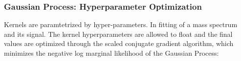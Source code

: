%
%
%            
%
%
%
%
    \subsubsection{Gaussian Process: Hyperparameter Optimization}
    \label{sec:hyperparam}
    Kernels are paramtetrized by hyper-parameters. In fitting of a mass spectrum and its signal. The kernel hyperparameters are allowed to float and the final values are optimized through the scaled conjugate gradient algorithm, which minimizes the negative log marginal likelihood of the Gaussian Process:

